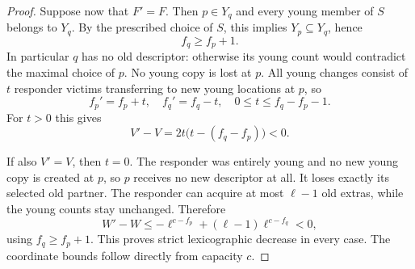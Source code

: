 \documentclass[11pt]{article}
\begin{document}
\begin{proof}
Suppose now that $F'=F$. Then $p\in Y_q$ and every
young member of $S$ belongs to $Y_q$. By the prescribed
choice of $S$, this implies $Y_p\subseteq Y_q$, hence
\[
 f_q\ge f_p+1.
\]
In particular $q$ has no old descriptor: otherwise its
young count would contradict the maximal choice of $p$.
No young copy is lost at $p$. All young changes consist
of $t$ responder victims transferring to new young locations
at $p$, so
\[
 f_p'=f_p+t,\quad f_q'=f_q-t,\quad
 0\le t\le f_q-f_p-1.
\]
For $t>0$ this gives
\[
 V'-V=2t\bigl(t-(f_q-f_p)\bigr)<0.
\]

If also $V'=V$, then $t=0$. The responder was entirely
young and no new young copy is created at $p$, so $p$
receives no new descriptor at all. It loses exactly its
selected old partner. The responder can acquire at most
$\ell-1$ old extras, while the young counts stay unchanged.
Therefore
\[
 W'-W\le-\ell^{c-f_p}
       +(\ell-1)\ell^{c-f_q}<0,
\]
using $f_q\ge f_p+1$.
This proves strict lexicographic decrease in every case.
The coordinate bounds follow directly from capacity $c$.
\end{proof}
\end{document}
